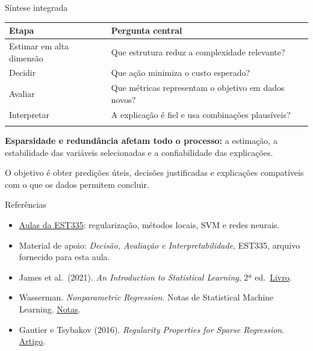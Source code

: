 \documentclass[
  10pt,
  ignorenonframetext,
  aspectratio=169,
  brazilian,
]{beamer}
\newcounter{none} %
\providecommand{\tightlist}{%
  \setlength{\itemsep}{0pt}\setlength{\parskip}{0pt}}
\begin{document}
\begin{frame}{Síntese integrada}
\protect{}\label{suxedntese-integrada}
{\def\LTcaptype{none} %
\begin{longtable}[]{@{}
  >{\raggedright\arraybackslash}p{}
  >{\raggedright\arraybackslash}p{}@{}}
\toprule\noalign{}
\begin{minipage}[b]{\linewidth}\raggedright
Etapa
\end{minipage} & \begin{minipage}[b]{\linewidth}\raggedright
Pergunta central
\end{minipage} \\
\midrule\noalign{}
\endhead
Estimar em alta dimensão & Que estrutura reduz a complexidade
relevante? \\
Decidir & Que ação minimiza o custo esperado? \\
Avaliar & Que métricas representam o objetivo em dados novos? \\
Interpretar & A explicação é fiel e usa combinações plausíveis? \\
\bottomrule\noalign{}
\end{longtable}
}

\textbf{Esparsidade e redundância afetam todo o processo:} a estimação,
a estabilidade das variáveis selecionadas e a confiabilidade das
explicações.

O objetivo é obter predições úteis, decisões justificadas e explicações
compatíveis com o que os dados permitem concluir.
\end{frame}

\begin{frame}{Referências}
\protect{}\label{referuxeancias}
\begin{itemize}
\tightlist
\item
  \href{https://www.professortp.com.br/est335/aulas.html}{Aulas da
  EST335}: regularização, métodos locais, SVM e redes neurais.
\item
  Material de apoio: \emph{Decisão, Avaliação e Interpretabilidade},
  EST335, arquivo fornecido para esta aula.
\item
  James et al.~(2021). \emph{An Introduction to Statistical Learning},
  2ª ed.~\href{https://www.statlearning.com/}{Livro}.
\item
  Wasserman. \emph{Nonparametric Regression}. Notas de Statistical
  Machine Learning.
  \href{https://stat.cmu.edu/~larry/=sml/nonpar.pdf}{Notas}.
\item
  Gautier e Tsybakov (2016). \emph{Regularity Properties for Sparse
  Regression}.
  \href{https://pmc.ncbi.nlm.nih.gov/articles/mid/NIHMS750383/}{Artigo}.
\end{itemize}
\end{frame}
\end{document}
